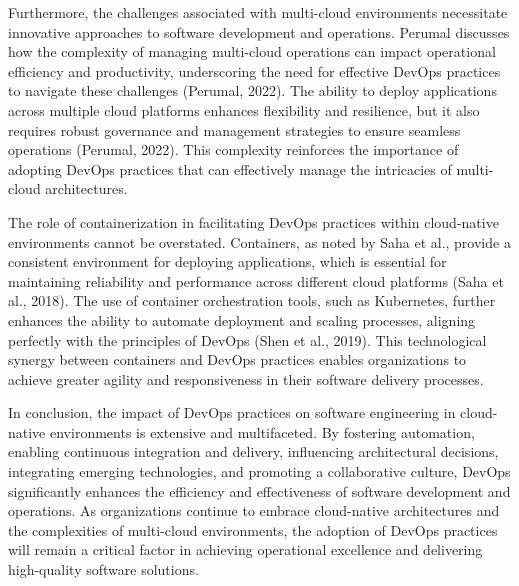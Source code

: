 Furthermore, the challenges associated with multi-cloud environments necessitate innovative approaches to software development and operations. Perumal discusses how the complexity of managing multi-cloud operations can impact operational efficiency and productivity, underscoring the need for effective DevOps practices to navigate these challenges (Perumal, 2022). The ability to deploy applications across multiple cloud platforms enhances flexibility and resilience, but it also requires robust governance and management strategies to ensure seamless operations (Perumal, 2022). This complexity reinforces the importance of adopting DevOps practices that can effectively manage the intricacies of multi-cloud architectures.

The role of containerization in facilitating DevOps practices within cloud-native environments cannot be overstated. Containers, as noted by Saha et al., provide a consistent environment for deploying applications, which is essential for maintaining reliability and performance across different cloud platforms (Saha et al., 2018). The use of container orchestration tools, such as Kubernetes, further enhances the ability to automate deployment and scaling processes, aligning perfectly with the principles of DevOps (Shen et al., 2019). This technological synergy between containers and DevOps practices enables organizations to achieve greater agility and responsiveness in their software delivery processes.

In conclusion, the impact of DevOps practices on software engineering in cloud-native environments is extensive and multifaceted. By fostering automation, enabling continuous integration and delivery, influencing architectural decisions, integrating emerging technologies, and promoting a collaborative culture, DevOps significantly enhances the efficiency and effectiveness of software development and operations. As organizations continue to embrace cloud-native architectures and the complexities of multi-cloud environments, the adoption of DevOps practices will remain a critical factor in achieving operational excellence and delivering high-quality software solutions.

